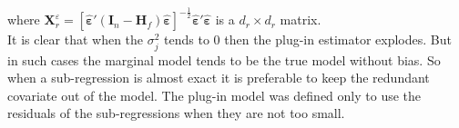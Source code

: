 \documentclass[12pt,a4paper]{report}
\begin{document}
where $\boldsymbol{X}_r^{\varepsilon}=[\hat{\boldsymbol{\varepsilon}}'(\boldsymbol{I}_n-\boldsymbol{H}_f)\hat{\boldsymbol{\varepsilon}}]^{-\frac{1}{2}}\hat{\boldsymbol{\varepsilon}}'\hat{\boldsymbol{\varepsilon}}$ is a $d_r\times d_r$ matrix.\\ It is clear that when the $\sigma_j^2$ tends to 0 then the plug-in estimator explodes. But in such cases the marginal model tends to be the true model without bias. So when a sub-regression is almost exact it is preferable to keep the redundant covariate out of the model. The plug-in model was defined only to use the residuals of the sub-regressions when they are not too small.
\end{document}
